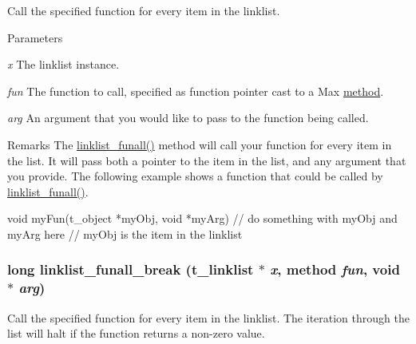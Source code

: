 Call the specified function for every item in the linklist. 
\begin{DoxyParams}{Parameters}
\item[{\em x}]The linklist instance. \item[{\em fun}]The function to call, specified as function pointer cast to a Max \hyperlink{group__datatypes_gac26ba0a173b50597f5738132e059b42d}{method}. \item[{\em arg}]An argument that you would like to pass to the function being called.\end{DoxyParams}
\begin{DoxyRemark}{Remarks}
The \hyperlink{group__linklist_ga6f4496ef6dc1d6d121acf25d7cd5f946}{linklist\_\-funall()} method will call your function for every item in the list. It will pass both a pointer to the item in the list, and any argument that you provide. The following example shows a function that could be called by \hyperlink{group__linklist_ga6f4496ef6dc1d6d121acf25d7cd5f946}{linklist\_\-funall()}. 
\begin{DoxyCode}
    void myFun(t_object *myObj, void *myArg)
    {
        // do something with myObj and myArg here
        // myObj is the item in the linklist
    }
\end{DoxyCode}
 
\end{DoxyRemark}
\hypertarget{group__linklist_ga27a9d3cdcacb995dcc7ce7a80daf57b6}{
\subsubsection[{linklist\_\-funall\_\-break}]{\setlength{\rightskip}{0pt plus 5cm}long linklist\_\-funall\_\-break ({\bf t\_\-linklist} $\ast$ {\em x}, \/  {\bf method} {\em fun}, \/  void $\ast$ {\em arg})}}
\label{group__linklist_ga27a9d3cdcacb995dcc7ce7a80daf57b6}


Call the specified function for every item in the linklist. The iteration through the list will halt if the function returns a non-\/zero value.


